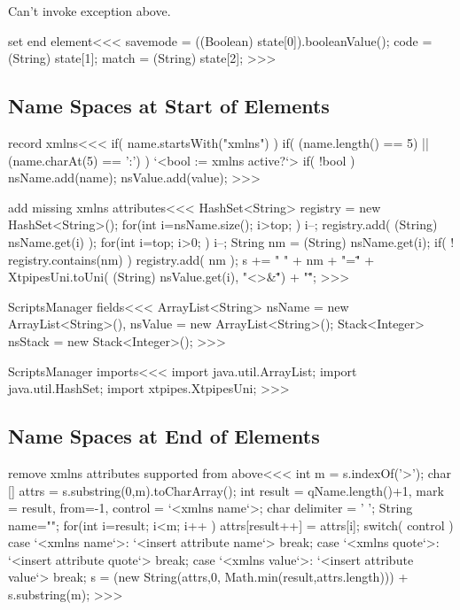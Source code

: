 \documentclass{article}
\begin{document}
Can't invoke exception above.

\<set end element\><<<  
savemode = ((Boolean) state[0]).booleanValue();
code = (String) state[1]; 
match = (String) state[2];
>>>




\subsection{Name Spaces at Start of Elements}

\<record xmlns\><<<
if( name.startsWith("xmlns") ){     
  if( (name.length() == 5) || (name.charAt(5) == ':') ){
     `<bool := xmlns active?`>
     if( !bool ){ 
        nsName.add(name); nsValue.add(value); 
} }  }
>>>





\<add missing xmlns attributes\><<<
HashSet<String> registry = new HashSet<String>();
for(int i=nsName.size(); i>top; ){
  i--;
  registry.add( (String) nsName.get(i) );
}
for(int i=top; i>0; ){
  i--;
  String nm = (String) nsName.get(i);
  if( ! registry.contains(nm) ){
     registry.add( nm );
     s += " " + nm + "=\"" + 
         XtpipesUni.toUni( (String) nsValue.get(i), "<>&\"") + "\"";
} }
>>>




\<ScriptsManager fields\><<<
ArrayList<String> nsName = new ArrayList<String>(), 
                         nsValue = new ArrayList<String>();
Stack<Integer> nsStack = new Stack<Integer>();
>>>

\<ScriptsManager imports\><<<
import java.util.ArrayList;
import java.util.HashSet;
import xtpipes.XtpipesUni;
>>>


\subsection{Name Spaces at End of Elements}


\<remove xmlns attributes supported from above\><<<
int m = s.indexOf('>');
char [] attrs = s.substring(0,m).toCharArray();
int result = qName.length()+1, 
    mark = result,
    from=-1,
    control = `<xmlns name`>;
char delimiter = ' ';
String name="";
for(int i=result; i<m; i++ ){
  attrs[result++] = attrs[i]; 
  switch( control ){
    case  `<xmlns name`>: { `<insert attribute name`>  break; }
    case `<xmlns quote`>: { `<insert attribute quote`> break; }
    case `<xmlns value`>: { `<insert attribute value`> break; }
} }
s =  (new String(attrs,0, Math.min(result,attrs.length)))
          + s.substring(m);
>>>
\end{document}
